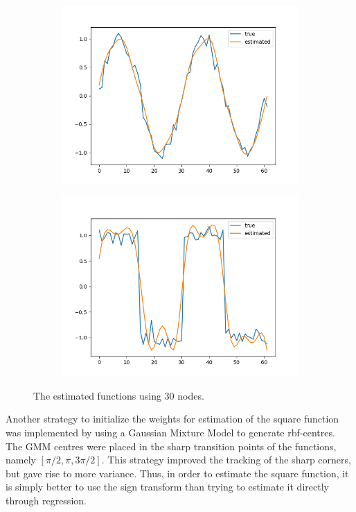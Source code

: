 \documentclass[a4paper]{article}
\begin{document}
\\
\begin{figure}[ht]
   \begin{subfigure}[b]{0.5\textwidth}
	 \centering
	 \includegraphics[width=\linewidth]{figures/sinenoisy.png}
   \end{subfigure}
 	\begin{subfigure}[b]{0.5\textwidth}
	 \centering
	 \includegraphics[width=\linewidth]{figures/squarenoisy.png}
   \end{subfigure}
   \caption{The estimated functions using 30 nodes.}
\end{figure}
Another strategy to initialize the weights for estimation of the square function was implemented by using a Gaussian Mixture Model to generate rbf-centres. The GMM centres were placed in the sharp transition points of the functions, namely $[\pi/2, \pi, 3\pi/2]$. This strategy improved the tracking of the sharp corners, but gave rise to more variance. Thus, in order to estimate the square function, it is simply better to use the sign transform than trying to estimate it directly through regression.
\end{document}
